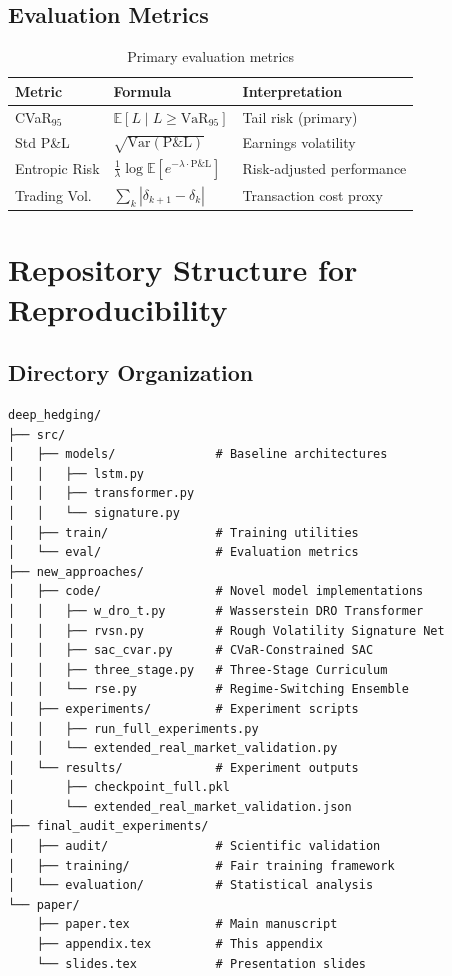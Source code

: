 \subsection{Evaluation Metrics}

\begin{table}[h]
\centering
\caption{Primary evaluation metrics}
\begin{tabular}{lll}
\toprule
\textbf{Metric} & \textbf{Formula} & \textbf{Interpretation} \\
\midrule
CVaR$_{95}$ & $\mathbb{E}[L \mid L \geq \text{VaR}_{95}]$ & Tail risk (primary) \\
Std P\&L & $\sqrt{\text{Var}(\text{P\&L})}$ & Earnings volatility \\
Entropic Risk & $\frac{1}{\lambda}\log\mathbb{E}[e^{-\lambda \cdot \text{P\&L}}]$ & Risk-adjusted performance \\
Trading Vol. & $\sum_k |\delta_{k+1} - \delta_k|$ & Transaction cost proxy \\
\bottomrule
\end{tabular}
\end{table}

\section{Repository Structure for Reproducibility}
\label{app:repository}

\subsection{Directory Organization}

\begin{verbatim}
deep_hedging/
├── src/
│   ├── models/              # Baseline architectures
│   │   ├── lstm.py
│   │   ├── transformer.py
│   │   └── signature.py
│   ├── train/               # Training utilities
│   └── eval/                # Evaluation metrics
├── new_approaches/
│   ├── code/                # Novel model implementations
│   │   ├── w_dro_t.py       # Wasserstein DRO Transformer
│   │   ├── rvsn.py          # Rough Volatility Signature Net
│   │   ├── sac_cvar.py      # CVaR-Constrained SAC
│   │   ├── three_stage.py   # Three-Stage Curriculum
│   │   └── rse.py           # Regime-Switching Ensemble
│   ├── experiments/         # Experiment scripts
│   │   ├── run_full_experiments.py
│   │   └── extended_real_market_validation.py
│   └── results/             # Experiment outputs
│       ├── checkpoint_full.pkl
│       └── extended_real_market_validation.json
├── final_audit_experiments/
│   ├── audit/               # Scientific validation
│   ├── training/            # Fair training framework
│   └── evaluation/          # Statistical analysis
└── paper/
    ├── paper.tex            # Main manuscript
    ├── appendix.tex         # This appendix
    └── slides.tex           # Presentation slides
\end{verbatim}


